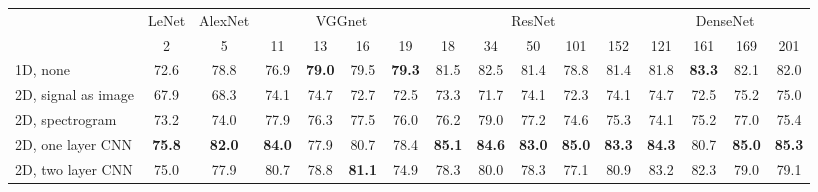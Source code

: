 \begin{tabular}{l | c | c | c c c c | c c c c c | c c c c }
	\toprule
	\multirow{2}{*}{\diagbox{Dim, S2I}{Model}} & LeNet         & AlexNet       & \multicolumn{4}{c|}{VGGnet} & \multicolumn{5}{c|}{ResNet} & \multicolumn{4}{c}{DenseNet}                                                                                                                                                                 \\
	& 2             & 5             & 11                          & 13                          & 16                           & 19            & 18            & 34            & 50            & 101           & 152           & 121           & 161           & 169           & 201           \\
	\midrule
	1D, none                                   & 72.6          & 78.8          & 76.9                        & \textbf{79.0}               & 79.5                         & \textbf{79.3} & 81.5          & 82.5          & 81.4          & 78.8          & 81.4          & 81.8          & \textbf{83.3} & 82.1          & 82.0          \\
	\midrule
	2D, signal as image                        & 67.9          & 68.3          & 74.1                        & 74.7                        & 72.7                         & 72.5          & 73.3          & 71.7          & 74.1          & 72.3          & 74.1          & 74.7          & 72.5          & 75.2          & 75.0          \\
	\midrule
	2D, spectrogram                            & 73.2          & 74.0          & 77.9                        & 76.3                        & 77.5                         & 76.0          & 76.2          & 79.0          & 77.2          & 74.6          & 75.3          & 74.1          & 75.2          & 77.0          & 75.4          \\
	\midrule
	2D, one layer CNN                          & \textbf{75.8} & \textbf{82.0} & \textbf{84.0}               & 77.9                        & 80.7                         & 78.4          & \textbf{85.1} & \textbf{84.6} & \textbf{83.0} & \textbf{85.0} & \textbf{83.3} & \textbf{84.3} & 80.7          & \textbf{85.0} & \textbf{85.3} \\
	\midrule
	2D, two layer CNN                          & 75.0          & 77.9          & 80.7                        & 78.8                        & \textbf{81.1}                & 74.9          & 78.3          & 80.0          & 78.3          & 77.1          & 80.9          & 83.2          & 82.3          & 79.0          & 79.1          \\
	\bottomrule
\end{tabular}

